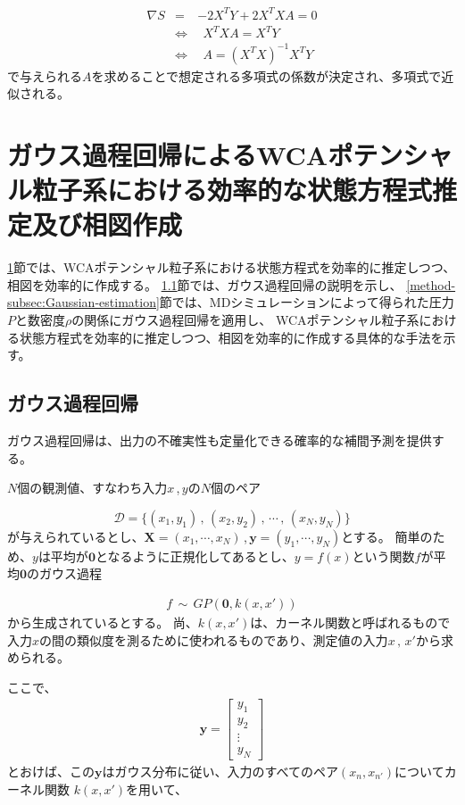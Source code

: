 \documentclass[titlepage]{jsreport}
\begin{document}
{{{\large
\begin{eqnarray}
    {\nabla}S&=&-2X^TY+2X^TXA=0\nonumber\\
    &{\Leftrightarrow}&{\ }{\ }X^TXA=X^TY\nonumber\\
    &{\Leftrightarrow}&{\ }{\ }A=(X^TX)^{-1}X^TY\label{eq:normal-equation}
\end{eqnarray}
\normalsize
で与えられる$A$を求めることで想定される多項式の係数が決定され、多項式で近似される\cite{least-squares}。



\section{ガウス過程回帰によるWCAポテンシャル粒子系における効率的な状態方程式推定及び相図作成}\label{method-sec:Gauss}
\ref{method-sec:Gauss}節では、WCAポテンシャル粒子系における状態方程式を効率的に推定しつつ、相図を効率的に作成する。
\ref{method-subsec:Gauss}節では、ガウス過程回帰の説明を示し、
\ref{method-subsec:Gaussian-estimation}節では、MDシミュレーションによって得られた圧力$P$と数密度$\rho$の関係にガウス過程回帰を適用し、
WCAポテンシャル粒子系における状態方程式を効率的に推定しつつ、相図を効率的に作成する具体的な手法を示す。


\subsection{ガウス過程回帰}\label{method-subsec:Gauss}
ガウス過程回帰は、出力の不確実性も定量化できる確率的な補間予測を提供する\cite{machine-learning}。


$N$個の観測値、すなわち入力$x$\,,\,$y$の$N$個のペア

\large
\[
    \mathcal{D}=\{(x_1,y_1)\,,\,(x_2,y_2)\,,\,\cdots\,,\,(x_N,y_N)\}
\]
\normalsize
が与えられているとし、$\bm{X}=(x_1,\cdots,x_N)$\,,\,$\bm{y}=(y_1,\cdots,y_N)$とする。
簡単のため、$y$は平均が$\bm{0}$となるように正規化してあるとし、$y=f(x)$という関数$f$が平均$\bm{0}$のガウス過程

\large
\begin{eqnarray}
    f\,{\sim}\,GP(\bm{0},k(x,x'))\nonumber
\end{eqnarray}
\normalsize
から生成されているとする。
尚、$k(x,x')$は、カーネル関数と呼ばれるもので入力$x$の間の類似度を測るために使われるものであり\cite{Gauss-machine-learning}、測定値の入力$x\,,\,x'$から求められる。

ここで、
\large
\begin{eqnarray}
\bm{y}=  
    \left[
        \begin{array}{c}
        y_1\\
        y_2\\
        \vdots\\
        y_N
        \end{array}
    \right] \nonumber
\end{eqnarray}
\normalsize
とおけば、この$\bm{y}$はガウス分布に従い、入力のすべてのペア$(x_n,x_{n'})$についてカーネル関数
$k(x,x')$を用いて、

}}}
\end{document}
